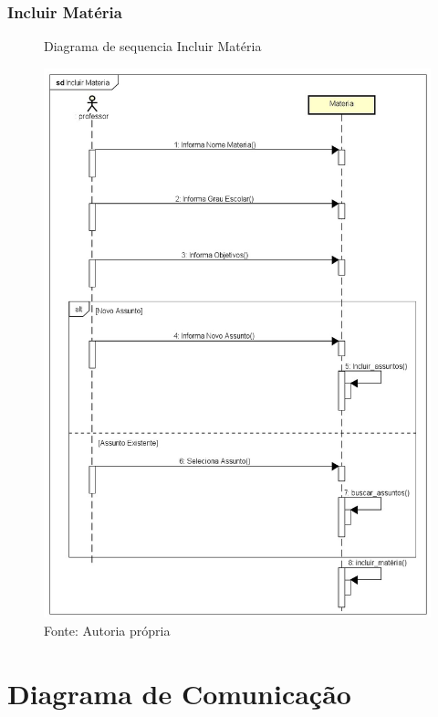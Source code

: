 \documentclass{utfpr-pg}
\begin{document}
    \subsection{Incluir Matéria}
        \begin{figure}[H]
            \centering
            \captionsetup{width=0.9\textwidth}
            \caption{Diagrama de sequencia Incluir Matéria}
            \includegraphics[width=0.95\linewidth]{fotos/seq2.jpg}
            \caption*{Fonte: Autoria própria}
            \label{fig:Diagrama de Classes}
        \end{figure}
    
\chapter{Diagrama de Comunicação}
    \label{chapter:diagrama de comunicacao}
\end{document}
